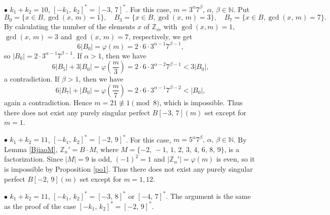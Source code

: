 \documentclass[12pt]{article}
\newtheorem{open problem}{Open problem}[section]
\begin{document}
$\bullet$ $k_1+k_2=10$, $[-k_1, \,k_2]^*=[-3, \,7]^*$. For this case, $m=3^\alpha7^\beta, \, \alpha, \, \beta\in\mathbb{N}$. Put
$$B_0=\{x\in B, \gcd(x, \,m)=1\}, \quad B_3=\{x\in B, \gcd(x, \,m)=3\}, \quad B_7=\{x\in B, \gcd(x, \,m)=7\}.$$
By calculating the number of the elements $x$ of $\mathbb{Z}_m$ with $\gcd(x, m)=1$, $\gcd(x, \,m)=3$ and $\gcd(x, \,m)=7$, respectively, we get
$$ 6|B_0|=\varphi(m)=2\cdot6\cdot3^{\alpha-1}7^{\beta-1},$$
so $|B_0|=2\cdot3^{\alpha-1}7^{\beta-1}$. If $\alpha>1$, then we have
$$6|B_5|+3|B_0|=\varphi(\frac{m}{3})=2\cdot6\cdot3^{\alpha-2}7^{\beta-1}<3|B_0|,$$
a contradiction. If $\beta>1$, then we have
$$6|B_7|+|B_0|=\varphi(\frac{m}{7})=2\cdot6\cdot3^{\alpha-1}7^{\beta-2}<|B_0|,$$
 again a contradiction.  Hence $m=21\not\equiv1\pmod{8}$, which is impossible. Thus there does not exist any purely singular perfect $B[-3, \,7](m)$ set except for $m=1$.


$\bullet$ $k_1+k_2=11$, $[-k_1, \,k_2]^*=[-2, \,9]^*$. For this case, $m=5^\alpha7^\beta, \, \alpha, \, \beta\in\mathbb{N}$. By Lemma \ref{BjiaoM}, $\mathbb{Z}_n'=B\cdot M$, where $M=\{-2, \, -1, \, 1, \, 2, \,3, \, 4, \, 6, \,8, \,9\}$, is a factorization. Since $|M|=9$ is odd, $(-1)^2=1$ and $|\mathbb{Z}_n'|=\varphi(m)$ is even, so it is impossible by Proposition \ref{po1}. Thus there does not exist any purely singular perfect $B[-2, \,9](m)$ set except for $m=1, 12$.

$\bullet$ $k_1+k_2=11$, $[-k_1, \,k_2]^*=[-3, \,8]^*$ or $[-4, \,7]^*$. The argument is the same as the proof of the case $[-k_1, \,k_2]^*=[-2, \,9]^*$.
\end{document}
